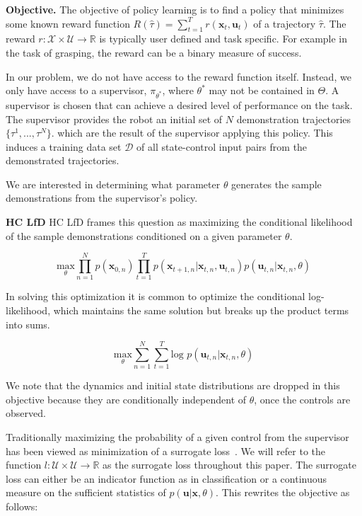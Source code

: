 \documentclass[10pt, conference]{ieeeconf}      %
\newcommand{\bu}{\mathbf{u}}
\newcommand{\bx}{\mathbf{x}}
\newcommand{\ns}{HC LfD }
\begin{document}
\noindent\textbf{Objective.} The objective of policy learning is to find a policy that minimizes some known reward function $R(\hat{\tau}) = \sum^T_{t=1} r(\bx_t,\bu_t)$ of a trajectory $\hat{\tau}$. The reward $r:\mathcal{X}\times \mathcal{U}\to \mathbb{R}$ is typically user defined and task specific. 
For example in the task of grasping, the reward can be a binary measure of success.

In our problem, we do not have access to the reward function itself. Instead, we only have access to 
a supervisor, $\pi_{\theta^*}$, where $\theta^*$ may not be contained in $\Theta$. A supervisor is chosen that can achieve a desired level of performance on the task. The supervisor provides the robot an initial set
of $N$   demonstration trajectories $\lbrace \tau^1,...,\tau^N \rbrace$. 
which are the result of the supervisor applying this policy. This induces a training data set $\mathcal{D}$ of all state-control input pairs from the demonstrated trajectories.

We are interested in determining what parameter $\theta$ generates the sample demonstrations from the supervisor's policy. 

\noindent \textbf{\ns} \ns frames this  question as maximizing the conditional likelihood of the sample demonstrations conditioned on a given parameter $\theta$. 

$$\underset{\theta}{\mbox{max}} \prod^N_{n=1} p(\bx_{0,n}) \prod^T_{t=1} p(\bx_{t+1,n}|\bx_{t,n},\bu_{t,n})p(\bu_{t,n}|\bx_{t,n},\theta)$$

In solving this optimization it is common to optimize the conditional log-likelihood, which maintains the same solution but breaks up the product terms into sums. 

\begin{equation}\label{eq:m_likeli_obj}
\underset{\theta}{\mbox{max}} \sum^N_{n=1}\sum^T_{t=1}\mbox{log }p(\bu_{t,n}|\bx_{t,n},\theta)
\end{equation}


We note that the dynamics and initial state distributions are dropped in this objective because they are conditionally independent of $\theta$, once the controls are observed. 

 Traditionally maximizing the probability of a given control  from the supervisor has been viewed as minimization of a surrogate loss~\cite{ross2010reduction,ross2010efficient}. We will refer to the function $l : \mathcal{U} \times \mathcal{U} \rightarrow \mathbb{R}$ as the surrogate loss throughout this paper. The surrogate loss can either be an indicator function as in classification or a continuous measure on the sufficient statistics of $p(\bu|\bx,\theta)$.  This rewrites the objective as follows: 
\end{document}
